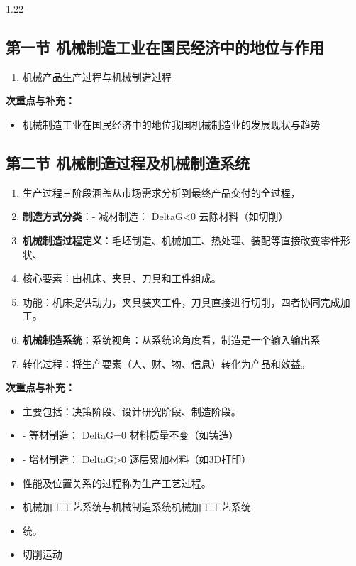 \documentclass[12pt,a4paper]{article}
\begin{document}
\begin{spacing}{1.22}
\subsection{第一节 机械制造工业在国民经济中的地位与作用}
\begin{tcolorbox}[colback=yellow!6,colframe=red!55!black,title=重点,left=1mm,right=1mm]
\begin{enumerate}[leftmargin=2.2em,label=\arabic*.]
  \item 机械产品生产过程与机械制造过程
\end{enumerate}
\end{tcolorbox}
\noindent\textbf{次重点与补充：}
\begin{itemize}[leftmargin=2.2em,label=--]
  \item 机械制造工业在国民经济中的地位我国机械制造业的发展现状与趋势
\end{itemize}

\subsection{第二节 机械制造过程及机械制造系统}
\begin{tcolorbox}[colback=yellow!6,colframe=red!55!black,title=重点,left=1mm,right=1mm]
\begin{enumerate}[leftmargin=2.2em,label=\arabic*.]
  \item 生产过程三阶段涵盖从市场需求分析到最终产品交付的全过程，
  \item \textbf{制造方式分类}：- 减材制造： DeltaG<0 去除材料（如切削）
  \item \textbf{机械制造过程定义}：毛坯制造、机械加工、热处理、装配等直接改变零件形状、
  \item 核心要素：由机床、夹具、刀具和工件组成。
  \item 功能：机床提供动力，夹具装夹工件，刀具直接进行切削，四者协同完成加工。
  \item \textbf{机械制造系统}：系统视角：从系统论角度看，制造是一个输入输出系
  \item 转化过程：将生产要素（人、财、物、信息）转化为产品和效益。
\end{enumerate}
\end{tcolorbox}
\noindent\textbf{次重点与补充：}
\begin{itemize}[leftmargin=2.2em,label=--]
  \item 主要包括：决策阶段、设计研究阶段、制造阶段。
  \item - 等材制造： DeltaG=0 材料质量不变（如铸造）
  \item - 增材制造： DeltaG>0 逐层累加材料（如3D打印）
  \item 性能及位置关系的过程称为生产工艺过程。
  \item 机械加工工艺系统与机械制造系统机械加工工艺系统
  \item 统。
  \item 切削运动
\end{itemize}


\end{spacing}
\end{document}
